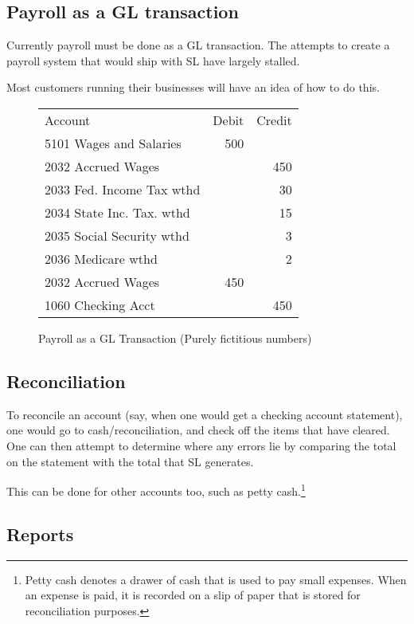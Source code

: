 \documentclass{article}
\begin{document}
\subsection{Payroll as a GL transaction}

Currently payroll must be done as a GL transaction.  The attempts to create a
payroll system that would ship with SL have largely stalled.

Most customers running their businesses will have an idea of how to do this.

\begin{figure}[hbtp]
\caption{Payroll as a GL Transaction (Purely fictitious numbers)}
\begin{tabular}{|l|r|r|}
\hline
Account & Debit & Credit \\
5101 Wages and Salaries & 500 & \\
2032 Accrued Wages & & 450 \\
2033 Fed. Income Tax wthd & & 30 \\
2034 State Inc. Tax. wthd & & 15 \\
2035 Social Security wthd & & 3 \\
2036 Medicare wthd & & 2 \\
2032 Accrued Wages & 450 & \\
1060 Checking Acct & & 450 \\
\hline
\end{tabular}
\end{figure}


\subsection{Reconciliation}

To reconcile an account (say, when one would get a checking account statement),
one would go to cash/reconciliation, and check off the items that have cleared.
One can then attempt to determine where any errors lie by comparing the total on
the statement with the total that SL generates.

This can be done for other accounts too, such as petty cash.\footnote{Petty cash
denotes a drawer of cash that is used to pay small expenses.  When an expense is
paid, it is recorded on a slip of paper that is stored for reconciliation
purposes.}

\subsection{Reports}
\end{document}
